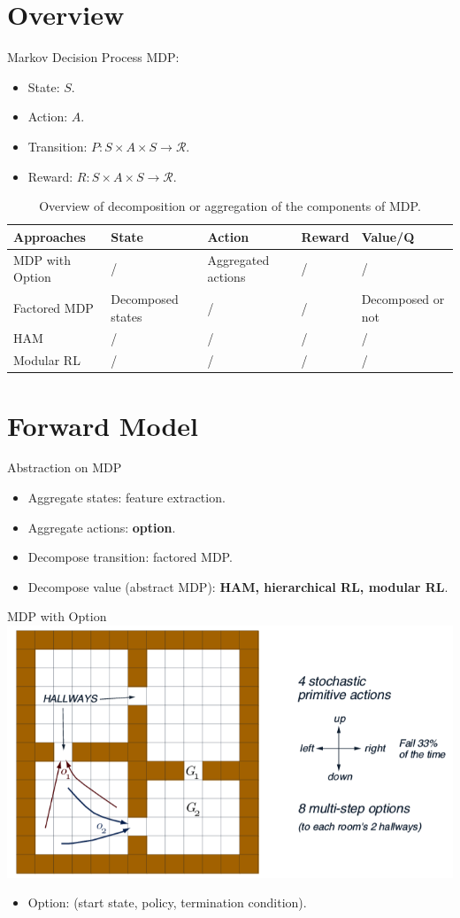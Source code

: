 \section{Overview}

Markov Decision Process
MDP:
\begin{itemize}
\item State: $S$.
\item Action: $A$.
\item Transition: $P: S \times A \times S \rightarrow \mathcal{R}$.
\item Reward: $R: S \times A \times S \rightarrow \mathcal{R}$.
\end{itemize}

\begin{table}
\centering
\begin{tabular}{| l | l | l | l | l |}
  \hline
  Approaches & State & Action & Reward & Value/Q \\
  \hline
  MDP with Option & / & Aggregated actions & / & /\\
  \hline
  Factored MDP & Decomposed states & / & / & Decomposed or not\\
  \hline
  HAM & / & / & / & / \\
  \hline
  Modular RL & / & / & / & / \\
  \hline
\end{tabular}
\label{tbl:overview}
\caption{Overview of decomposition or aggregation of the components of MDP.}
\end{table}

\section{Forward Model}

Abstraction on MDP
\begin{itemize}
  \item Aggregate states: feature extraction. 
  \item Aggregate actions: {\bf option}. 
  \item Decompose transition: factored MDP. 
  \item Decompose value (abstract MDP): {\bf HAM, hierarchical RL, modular RL}.
\end{itemize}



MDP with Option
\includegraphics[width=0.8\columnwidth]{option.png}
\begin{itemize}
  \item Option: (start state, policy, termination condition).
\end{itemize}



